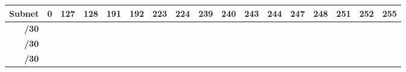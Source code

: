\documentclass[11pt,a4paper]{report}
\begin{document}
\begin{longtable}[c]{rcccccccccccccccc}
            \multicolumn{1}{c}{\multirow{-2}{*}{\textbf{Subnet}}}                                      & \cellcolor[HTML]{F4B084}0     & \cellcolor[HTML]{F4B084}127    & \cellcolor[HTML]{A9D08E}128    & \cellcolor[HTML]{A9D08E}191   & \cellcolor[HTML]{FFD966}192    & \cellcolor[HTML]{FFD966}223   & \cellcolor[HTML]{BFBFBF}224    & \cellcolor[HTML]{BFBFBF}239   & \cellcolor[HTML]{C09FE5}240 & \cellcolor[HTML]{C09FE5}243 & \cellcolor[HTML]{C09FE5}244 & \cellcolor[HTML]{C09FE5}247 & \cellcolor[HTML]{C09FE5}248 & \cellcolor[HTML]{C09FE5}251 & \cellcolor[HTML]{C09FE5}252 & \cellcolor[HTML]{C09FE5}255 \\ \hline
            \endhead
            \hline
            \endfoot
            \endlastfoot
            \textbf{/30}                                                                               &                               &                                &                                &                               &                                &                               &                                &                               &                             &                             &                             &                             &                             &                             & \cellcolor[HTML]{C09FE5}    & \cellcolor[HTML]{C09FE5}    \\
            \textbf{/30}                                                                               &                               &                                &                                &                               &                                &                               &                                &                               &                             &                             &                             &                             & \cellcolor[HTML]{C09FE5}    & \cellcolor[HTML]{C09FE5}    &                             &                             \\
            \textbf{/30}                                                                               &                               &                                &                                &                               &                                &                               &                                &                               &                             &                             & \cellcolor[HTML]{C09FE5}    & \cellcolor[HTML]{C09FE5}    &                             &                             &                             &                             \\

\end{longtable}
\end{document}
